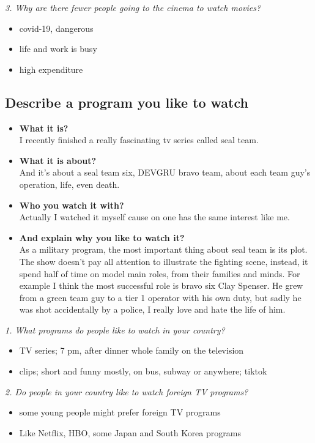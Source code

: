 \documentclass[conference]{IEEEtran}
\begin{document}
\textit{3. Why are there fewer people going to the cinema to watch movies?}
\begin{itemize}
    \item covid-19, dangerous
    \item life and work is busy
    \item high expenditure
\end{itemize}

\subsection{Describe a program you like to watch}
\begin{itemize}
    \item \textbf{What it is?}\\
    I recently finished a really fascinating tv series called seal team.
    \item \textbf{What it is about?}\\
    And it's about a seal team six, DEVGRU bravo team, about each team guy's operation, life, even death.
    \item \textbf{Who you watch it with?}\\
    Actually I watched it myself cause on one has the same interest like me.
    \item \textbf{And explain why you like to watch it?}\\
    As a military program, the most important thing about seal team is its plot.
    The show doesn't pay all attention to illustrate the fighting scene, instead, it spend half of time on
    model main roles, from their families and minds.
    For example I think the most successful role is bravo six Clay Spenser.
    He grew from a green team guy to a tier 1 operator with his own duty, but sadly he was shot accidentally
    by a police, I really love and hate the life of him.
\end{itemize}

\textit{1. What programs do people like to watch in your country?}
\begin{itemize}
    \item TV series; 7 pm, after dinner whole family on the television
    \item clips; short and funny mostly, on bus, subway or anywhere; tiktok
\end{itemize}

\textit{2. Do people in your country like to watch foreign TV programs?}
\begin{itemize}
    \item some young people might prefer foreign TV programs
    \item Like Netflix, HBO, some Japan and South Korea programs
\end{itemize}
\end{document}
